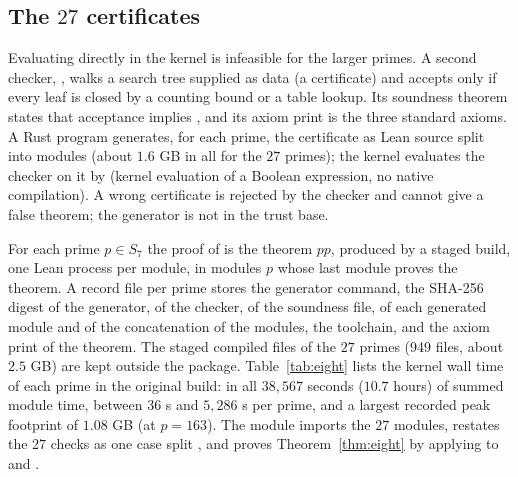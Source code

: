 \documentclass[11pt]{article}
\theoremstyle{remark}
\begin{document}
\subsection{The $27$ certificates}\label{sec:eight-cert}

Evaluating  directly in the kernel is infeasible for the larger primes. A second checker, , walks a search tree supplied as data (a certificate) and accepts only if every leaf is closed by a counting bound or a table lookup. Its soundness theorem  states that acceptance implies , and its axiom print is the three standard axioms. A Rust program generates, for each prime, the certificate as Lean source split into modules (about $1.6$ GB in all for the $27$ primes); the kernel evaluates the checker on it by  (kernel evaluation of a Boolean expression, no native compilation). A wrong certificate is rejected by the checker and cannot give a false theorem; the generator is not in the trust base.

For each prime $p\in S_7$ the proof of  is the theorem $p$$p$, produced by a staged build, one Lean process per module, in modules $p$ whose last module  proves the theorem. A record file per prime stores the generator command, the SHA-256 digest of the generator, of the checker, of the soundness file, of each generated module and of the concatenation of the modules, the toolchain, and the axiom print of the theorem. The staged compiled files of the $27$ primes (949 files, about $2.5$ GB) are kept outside the  package. Table~\ref{tab:eight} lists the kernel wall time of each prime in the original build: in all $38{,}567$ seconds ($10.7$ hours) of summed module time, between $36$ s and $5{,}286$ s per prime, and a largest recorded peak footprint of $1.08$ GB (at $p=163$). The module  imports the $27$  modules, restates the $27$ checks as one case split , and proves Theorem~\ref{thm:eight} by applying  to  and .
\end{document}

